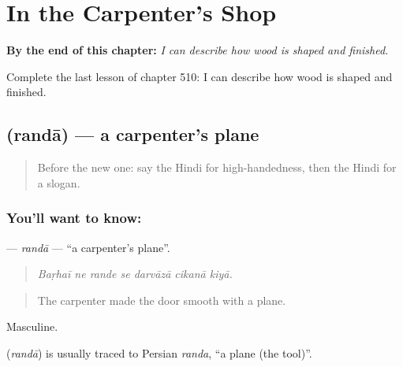 
\chapter{In the Carpenter's Shop}
\label{ch:hi-in-the-carpenter-s-shop}

\begin{chapteropening}
\textbf{By the end of this chapter:} \emph{I can describe how wood is shaped and finished.}

Complete the last lesson of chapter 510: I can describe how wood is shaped and finished.
\end{chapteropening}

\section[\texorpdfstring{\hi{रंदा} (randā)}{रंदा (randā)}]{ (randā) — a carpenter's plane}

\label{lesson:HI-C510-randa}



\begin{quote}
Before the new one: say the Hindi for high-handedness, then the Hindi for a slogan.
\end{quote}

\subsection*{You'll want to know: }
\textbf{} — \emph{randā} — \textquotedblleft{}a carpenter's plane\textquotedblright{}.

\begin{quote}
      
\end{quote}

\begin{quote}
\emph{Baṛhaī ne rande se darvāzā cikanā kiyā.}
\end{quote}

\begin{quote}
The carpenter made the door smooth with a plane.
\end{quote}

Masculine.

\begin{cousinweb}
\textbf{} (\emph{randā}) is usually traced to Persian \emph{randa}, \textquotedblleft{}a plane (the tool)\textquotedblright{}.
\end{cousinweb}

